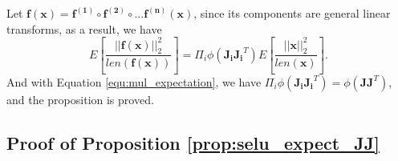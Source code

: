 \documentclass[10pt,journal,compsoc]{IEEEtran}
\begin{document}
Let $\mathbf{f}(\mathbf{x})=\mathbf{f^{(1)}}\circ\mathbf{f^{(2)}}\circ...\mathbf{f^{(n)}}(\mathbf{x})$, since its components are general linear transforms, as a result, we have
\begin{equation}
    E\left[\frac{||\mathbf{f}(\mathbf{x})||_2^2}{len(\mathbf{f}(\mathbf{x}))}\right] = \Pi_i\phi(\mathbf{J_iJ_i}^T)E\left[\frac{||\mathbf{x}||_2^2}{len(\mathbf{x})}\right].
\end{equation}
And with Equation \eqref{equ:mul_expectation}, we have $\Pi_i\phi(\mathbf{J_iJ_i}^T) = \phi(\mathbf{JJ}^T)$, and the proposition is proved.



     

\subsection{Proof of Proposition \ref{prop:selu_expect_JJ}}\label{proof:selu_expect_JJ}
\end{document}

